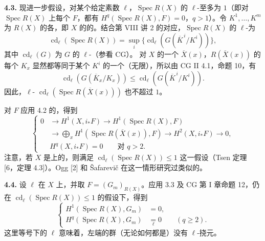 \textbf{4.3.} 现进一步假设，对某个给定素数 $\ell$，$\operatorname{Spec}R(X)$ 的 $\ell$-至多为 $1$（即对 $\operatorname{Spec}R(X)$ 上每个 $F$，都有 $H^q(\operatorname{Spec}R(X),F)=0$，$q>1$）。令 $K^1,\ldots,K^m$ 为 $R(X)$ 的各，即 $X$ 的的。结合第 VIII 讲 2 的对应，$\operatorname{Spec}R(X)$ 的 $\ell$-为
\[
\operatorname{cd}_\ell(\operatorname{Spec}R(X))
 =\sup_i\{\operatorname{cd}_\ell(G(\overline K^{\,i}/K^i))\},
\]
其中 $\operatorname{cd}_\ell(G)$ 为 $G$ 的 $\ell$-（参看 CG）。
对 $X$ 的一个 $\overline X(x)$，$R(\overline X(x))$ 的每个 $K_x$ 显然都等同于某个 $K^i$ 的一个（无限），所以由 CG II 4.1，命题 10，有
\[
\operatorname{cd}_\ell(G(\overline K_x/K_x))
 \le\operatorname{cd}_\ell(G(\overline K^{\,i}/K^i)).
\]
因此，$\ell$- $\operatorname{cd}_\ell(\operatorname{Spec}R(\overline X(x)))$ 也不超过 $1$。

对 $F$ 应用 4.2 的，得到
\[
\left\{\begin{aligned}
0&\longrightarrow H^1(X,i_*F)\longrightarrow H^1(\operatorname{Spec}R(X),F)\\
&\longrightarrow\bigoplus_xH^1(\operatorname{Spec}R(\overline X(x)),F)
 \longrightarrow H^2(X,i_*F)\longrightarrow0,\\
&H^q(X,i_*F)=0\qquad\text{对 }q>2.
\end{aligned}\right.
\tag{4.3.1}
\]
注意，若 $X$ 是上的，则满足 $\operatorname{cd}_\ell(\operatorname{Spec}R(X))\le1$ 这一假设（Tsen 定理 [6，定理 4.3]）。Ogg [2] 和 Šafarevič 在这一情形研究过类似的。

\textbf{4.4.} 设 $\ell$ 在 $X$ 上，并取 $F=(G_m)_{R(X)}$。应用 3.3 及 CG 第 I 章命题 12，仍在 $\operatorname{cd}_\ell(\operatorname{Spec}R(X))\le1$ 的假设下，得到
\[
\left\{\begin{aligned}
H^1(\operatorname{Spec}R(X),G_m)&=0,\\
H^q(\operatorname{Spec}R(X),G_m)&\underset{\ell}{=}0\qquad(q\ge2).
\end{aligned}\right.
\tag{4.4.1}
\]
这里等号下的 $\ell$ 意味着，左端的群（无论如何都是）没有 $\ell$-挠元。

